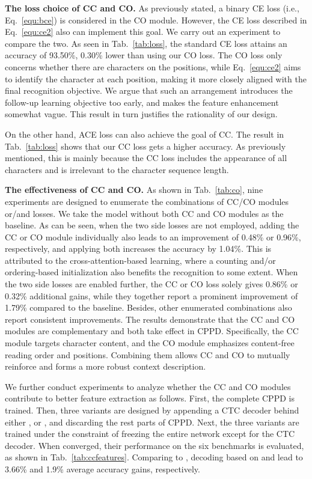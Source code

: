 \documentclass[10pt,journal,compsoc]{IEEEtran}
\begin{document}
\noindent\textbf{The loss choice of CC and CO.}
As previously stated, a binary CE loss (i.e., Eq.~\ref{equ:bce}) is considered in the CO module. However, the CE loss described in Eq.~\ref{equ:ce2} also can implement this goal. We carry out an experiment to compare the two. As seen in Tab.~\ref{tab:loss}, the standard CE loss attains an accuracy of 93.50\%, 0.30\% lower than using our CO loss. The CO loss only concerns whether there are characters on the positions, while Eq.~\ref{equ:ce2} aims to identify the character at each position, making it more closely aligned with the final recognition objective. We argue that such an arrangement introduces the follow-up learning objective too early, and makes the feature enhancement somewhat vague. This result in turn justifies the rationality of our design.

On the other hand, ACE loss \cite{xie2019aggregation} can also achieve the goal of CC. The result in Tab.~\ref{tab:loss} shows that our CC loss gets a higher accuracy. As previously mentioned, this is mainly because the CC loss includes the appearance of all characters and is irrelevant to the character sequence length. 


\noindent\textbf{The effectiveness of CC and CO.}
As shown in Tab.~\ref{tab:co}, nine experiments are designed to enumerate the combinations of CC/CO modules or/and losses. We take the model without both CC and CO modules as the baseline. As can be seen, when the two side losses are not employed, adding the CC or CO module individually also leads to an improvement of 0.48\% or 0.96\%, respectively, and applying both increases the accuracy by 1.04\%. This is attributed to the cross-attention-based learning, where a counting and/or ordering-based initialization also benefits the recognition to some extent. When the two side losses are enabled further, the CC or CO loss solely gives 0.86\% or 0.32\% additional gains, while they together report a prominent improvement of 1.79\% compared to the baseline. Besides, other enumerated combinations also report consistent improvements. The results demonstrate that the CC and CO modules are complementary and both take effect in CPPD. Specifically, the CC module targets character content, and the CO module emphasizes content-free reading order and positions. Combining them allows CC and CO to mutually reinforce and forms a more robust context description.


We further conduct experiments to analyze whether the CC and CO modules contribute to better feature extraction as follows. First, the complete CPPD is trained. Then, three variants are designed by appending a CTC decoder behind either ,  or , and discarding the rest parts of CPPD. Next, the three variants are trained under the constraint of freezing the entire network except for the CTC decoder. When converged, their performance on the six benchmarks is evaluated, as shown in Tab.~\ref{tab:ccfeatures}. Comparing to , decoding based on  and  lead to 3.66\% and 1.9\% average accuracy gains, respectively. 
\end{document}

